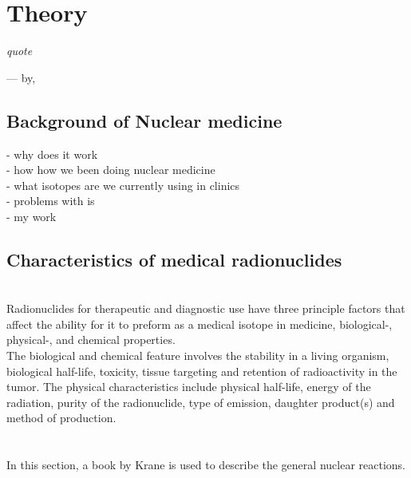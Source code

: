 \documentclass[twoside,english]{uiofysmaster/uiofysmaster}
\begin{document}
\chapter{Theory}
\label{ch: beyond}

\epigraph{\itshape quote}{--- \textup{by}, }
 


\section{Background of Nuclear medicine}
\label{sec:Background}

- why does it work \\
- how how we been doing nuclear medicine	\\
- what isotopes are we currently using in clinics\\
- problems with is\\
- my work\\

\section{Characteristics of medical radionuclides}
\noindent
\\
Radionuclides for therapeutic and diagnostic use have three principle factors that affect the ability for it to preform as a medical isotope in medicine\cite{invivo}, biological-, physical-, and chemical properties.\\
The biological and chemical feature involves the stability in a living organism, biological half-life, toxicity, tissue targeting and retention of radioactivity in the tumor\cite{Yeong}.
The physical characteristics include physical half-life, energy of the radiation, purity of the radionuclide, type of emission, daughter product(s) and method of production\cite{Yeong}. \\
\\\\
In this section, a book by Krane\cite{Krane} is used to describe the general nuclear reactions.\\
\end{document}
